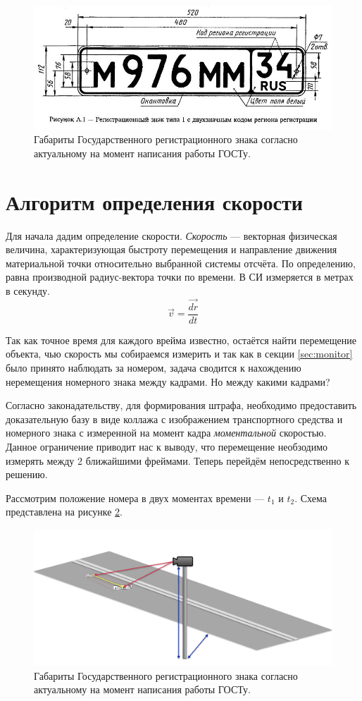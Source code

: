 \documentclass[specification,annotation,times]{itmo-student-thesis}
\begin{document}
\begin{figure}[!ht]
	\caption{Габариты Государственного регистрационного знака согласно актуальному на момент написания работы ГОСТу.}\label{img:licnum-gost}
	\includegraphics[width=0.85\linewidth]{../png/licnum1.jpeg}
	\centering
\end{figure}

\section{Алгоритм определения скорости}
Для начала дадим определение скорости. \textit{Скорость} ---  векторная физическая величина, характеризующая быстроту перемещения и направление движения материальной точки относительно выбранной системы отсчёта. По определению, равна производной радиус-вектора точки по времени. В СИ измеряется в метрах в секунду.
\begin{equation}
\mathit{\vec{v}=\frac{\vec{dr}} {dt}}
\label{eq:v}
\end{equation}

Так как точное время для каждого врейма известно, остаётся найти перемещение объекта, чью скорость мы собираемся измерить и так как в секции \ref{sec:monitor} было принято наблюдать за номером, задача сводится к нахождению неремещения номерного знака между кадрами. Но между какими кадрами? 

Согласно законадательству, для формирования штрафа, необходимо предоставить доказательную базу в виде коллажа с изображением транспортного средства и номерного знака с измеренной на момент кадра \textit{моментальной} скоростью. Данное ограничение приводит нас к выводу, что перемещение необзодимо измерять между 2 ближайшими фреймами. Теперь перейдём непосредственно к решению.

Рассмотрим положение номера в двух моментах времени --- $ t_1 $ и $ t_2 $. Схема представлена на рисунке \ref{img:r-scheme}.

\begin{figure}[!ht]
	\caption{Габариты Государственного регистрационного знака согласно актуальному на момент написания работы ГОСТу.}\label{img:r-scheme}
	\includegraphics[width=0.85\linewidth]{../png/r_scheme.png}
	\centering
\end{figure}
\end{document}
